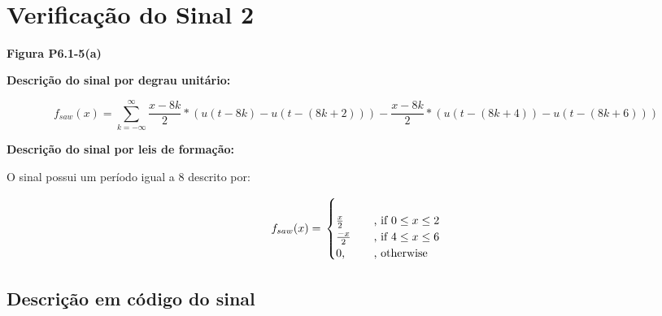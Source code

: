 \documentclass[11pt]{article}
\begin{document}
    \begin{center}
    \end{center}
    { \hspace*{\fill} \\}
    
    \hypertarget{verificauxe7uxe3o-do-sinal-2}{%
\section{Verificação do Sinal 2}\label{verificauxe7uxe3o-do-sinal-2}}

\textbf{Figura P6.1-5(a)}

\textbf{Descrição do sinal por degrau unitário:}

\[
f_{saw}(x) = 
  \sum_{k = -\infty}^{\infty} 
    \frac{x - 8k}{2} * 
      (u(t - 8k) - 
      u(t - (8k + 2))) -
    \frac{x - 8k}{2} * 
      (u(t - (8k + 4)) - 
      u(t - (8k + 6)))       
\]

\textbf{Descrição do sinal por leis de formação:}

O sinal possui um período igual a \(8\) descrito por:

\[
f_{saw}(x) = \\
  \begin{cases} \\
    \frac{x}{2} & \quad \text{, if }  0 \leq x \leq 2 \\
    \frac{-x}{2} & \quad \text{, if }  4 \leq x \leq 6 \\
    \text{0, } & \quad \text{, otherwise} \\
  \end{cases}
\]

    \hypertarget{descriuxe7uxe3o-em-cuxf3digo-do-sinal}{%
\subsection{Descrição em código do
sinal}\label{descriuxe7uxe3o-em-cuxf3digo-do-sinal}}
\end{document}
